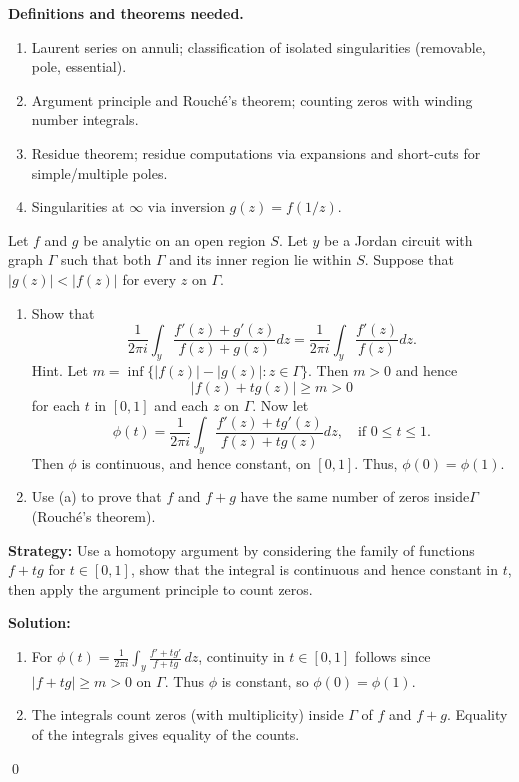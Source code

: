 \noindent\textbf{Definitions and theorems needed.}
\begin{enumerate}[label=(\alph*)]
\item Laurent series on annuli; classification of isolated singularities (removable, pole, essential).
\item Argument principle and Rouché's theorem; counting zeros with winding number integrals.
\item Residue theorem; residue computations via expansions and short-cuts for simple/multiple poles.
\item Singularities at $\infty$ via inversion $g(z)=f(1/z)$.
\end{enumerate}



\begin{problembox}
\begin{problemstatement}
Let \( f \) and \( g \) be analytic on an open region \( S \). Let \( y \) be a Jordan circuit with graph \( \Gamma \) such that both \( \Gamma \) and its inner region lie within \( S \). Suppose that \( |g(z)| < |f(z)| \) for every \( z \) on \( \Gamma \).
\begin{enumerate}[label=(\alph*)]
\item Show that
\[ \frac{1}{2\pi i} \int_{y} \frac{f'(z) + g'(z)}{f(z) + g(z)} dz = \frac{1}{2\pi i} \int_{y} \frac{f'(z)}{f(z)} dz. \]
Hint. Let \( m = \inf \{ |f(z)| - |g(z)| : z \in \Gamma \} \). Then \( m > 0 \) and hence
\[ |f(z) + t g(z)| \geq m > 0 \]
for each \( t \) in \( [0, 1] \) and each \( z \) on \( \Gamma \). Now let
\[ \phi(t) = \frac{1}{2\pi i} \int_{y} \frac{f'(z) + t g'(z)}{f(z) + t g(z)} dz, \quad \text{if } 0 \leq t \leq 1. \]
Then \( \phi \) is continuous, and hence constant, on \( [0, 1] \). Thus, \( \phi(0) = \phi(1) \).
\item Use (a) to prove that \( f \) and \( f + g \) have the same number of zeros inside\(\Gamma\) (Rouché's theorem).
\end{enumerate}
\end{problemstatement}
\end{problembox}

\noindent\textbf{Strategy:} Use a homotopy argument by considering the family of functions \( f + t g \) for \( t \in [0,1] \), show that the integral is continuous and hence constant in \( t \), then apply the argument principle to count zeros.

\bigskip\noindent\textbf{Solution:}
\begin{enumerate}[label=(\alph*)]
\item For $\phi(t)=\frac{1}{2\pi i}\int_{y}\frac{f'+t g'}{f+tg}\,dz$, continuity in $t\in[0,1]$ follows since $|f+tg|\ge m>0$ on $\Gamma$. Thus $\phi$ is constant, so $\phi(0)=\phi(1)$.
\item The integrals count zeros (with multiplicity) inside $\Gamma$ of $f$ and $f+g$. Equality of the integrals gives equality of the counts.
\end{enumerate}\qed


